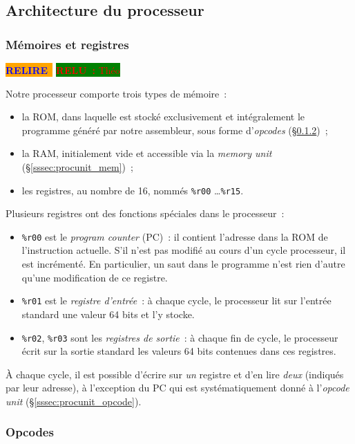\documentclass[11pt,a4paper]{article}
\newcommand{\relire}{\colorbox{orange}{\textcolor{blue}{\textbf{RELIRE}~}}}
\newcommand{\relu}[1]{\colorbox{green}{\textcolor{red}{\textbf{RELU~:} #1}}}
\begin{document}
\subsection{Architecture du processeur}

\subsubsection{Mémoires et registres} \label{sssec:memory}
\relire
\relu{Théo}

\noindent Notre processeur comporte trois types de mémoire~:
\begin{itemize}
\item la ROM, dans laquelle est stocké exclusivement et intégralement le programme généré par notre assembleur, sous forme d'\textit{opcodes} (§\ref{sssec:opcodes})~;

\item la RAM, initialement vide et accessible via la \textit{memory unit} (§\ref{sssec:procunit_mem})~;
\item les registres, au nombre de 16, nommés \texttt{\%r00} \ldots \texttt{\%r15}.
\end{itemize}

\noindent Plusieurs registres ont des fonctions spéciales dans le processeur~:
\begin{itemize}
\item \texttt{\%r00} est le \emph{program counter} (PC)~: il contient l'adresse dans la ROM de l'instruction actuelle. S'il n'est pas modifié au cours d'un cycle processeur, il est incrémenté. En particulier, un saut dans le programme n'est rien d'autre qu'une modification de ce registre.
\item \texttt{\%r01} est le \emph{registre d'entrée}~: à chaque cycle, le processeur lit sur l'entrée standard une valeur 64 bits et l'y stocke.
\item \texttt{\%r02}, \texttt{\%r03} sont les \emph{registres de sortie}~: à chaque fin de cycle, le processeur écrit sur la sortie standard les valeurs 64 bits contenues dans ces registres.
\end{itemize}

À chaque cycle, il est possible d'écrire sur \emph{un} registre et d'en lire \emph{deux} (indiqués par leur adresse), à l'exception du PC qui est systématiquement donné à l'\textit{opcode unit} (§\ref{sssec:procunit_opcode}).

\subsubsection{Opcodes} \label{sssec:opcodes}
\end{document}
